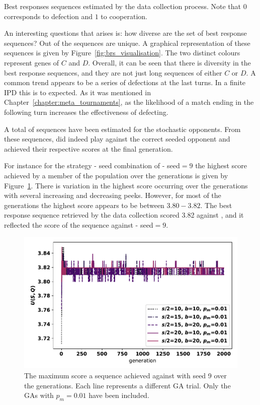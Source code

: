 \begin{table}[!htbp]
    \resizebox{\textwidth}{!}{
    }
    \caption{Best responses sequences estimated by the data collection process.
    Note that \(0\) corresponds to defection and \(1\) to cooperation.}
    \label{table:adaptive_best_responses}
\end{table}

An interesting questions that arises is: how diverse are the set of best response
sequences? Out of the \deterministicsequences sequences \stochasticuniquesequences are unique. A graphical
representation of these sequences is given by Figure~\ref{fig:brs_visualisation}.
The two distinct colours represent genes of \(C\) and \(D\). Overall, it can be
seen that there is diversity in the best response sequences, and they are not just
long sequences of either \(C\) or \(D\). A common trend appears to be a series
of defections at the last turns. In a finite IPD this is to expected. As it was
mentioned in Chapter~\ref{chapter:meta_tournaments}, as the likelihood of a
match ending in the following turn increases the effectiveness of defecting.

A total of \stochasticsequences sequences have been estimated for the stochastic opponents. From
these sequences, \reproducible did indeed play against the correct seeded opponent and
achieved their respective scores at the final generation.

For instance for the strategy - seed combination of \Champion - seed\(=9\) the highest score
achieved by a member of the population over the generations is given by
Figure~\ref{fig:champion_ga_score}. There is variation in the highest score
occurring over the generations with several increasing and decreasing peeks. However,
for most of the generations the highest score appears to be between \(3.80 - 3.82\).
The best response sequence retrieved by the data collection scored 3.82 against
\Champion, and it reflected the score of the sequence against \Champion - seed\(=9\).

\begin{figure}[!htbp]
    \centering
    \includegraphics[width=.7\textwidth]{src/chapters/06/img/maximum_score_per_generation_champion.pdf}
    \caption{The maximum score a sequence achieved against \Champion with seed 9
    over the generations. Each line represents a different GA trial. Only the
    GAs with \(p_m=0.01\) have been included.}\label{fig:champion_ga_score}
\end{figure}

